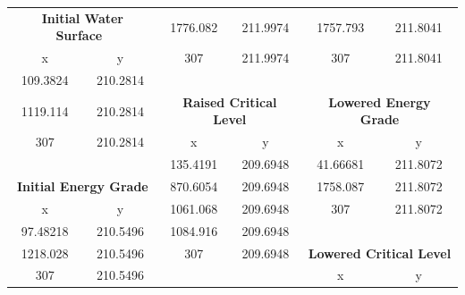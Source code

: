 \begin{center}
\begin{tabular}{|cc|cc|cc|}
                \multicolumn{2}{|c|}{\textbf{Initial Water Surface~}}   & 1776.082 & 211.9974                                 & 1757.793 & 211.8041                                         \\ 
                \cline{1-2}
                x        & y                                            & 307      & 211.9974                                 & 307      & 211.8041                                         \\
                109.3824 & 210.2814                                     &          &                                          &          &                                                  \\
                1119.114 & 210.2814                                     & \multicolumn{2}{c|}{\textbf{Raised Critical Level}} & \multicolumn{2}{c|}{\textbf{Lowered Energy Grade}}          \\ 
                \cline{3-6}
                307      & 210.2814                                     & x        & y                                        & x        & y                                                \\
                         &                                              & 135.4191 & 209.6948                                 & 41.66681 & 211.8072                                         \\
                \multicolumn{2}{|c|}{\textbf{Initial Energy Grade}}     & 870.6054 & 209.6948                                 & 1758.087 & 211.8072                                         \\ 
                \cline{1-2}
                x        & y                                            & 1061.068 & 209.6948                                 & 307      & 211.8072                                         \\
                97.48218 & 210.5496                                     & 1084.916 & 209.6948                                 &          &                                                  \\
                1218.028 & 210.5496                                     & 307      & 209.6948                                 & \multicolumn{2}{c|}{\textbf{Lowered Critical Level }}       \\ 
                \cline{5-6}
                307      & 210.5496                                     &          &                                          & x        & y                                                \\

\end{tabular}
\end{center}

